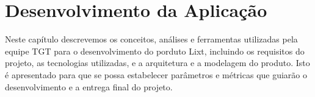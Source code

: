 \chapter{Desenvolvimento da Aplicação}

Neste capítulo descrevemos os conceitos, análises e ferramentas
utilizadas pela equipe TGT para o desenvolvimento do porduto Lixt,
incluindo os requisitos do projeto, as tecnologias utilizadas, e a
arquitetura e a modelagem do produto.
Isto é apresentado para que se possa estabelecer parâmetros e métricas
que guiarão o desenvolvimento e a entrega final do projeto.

















